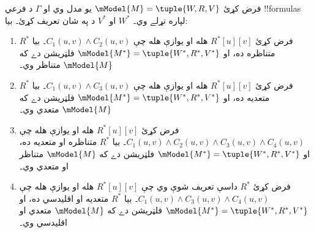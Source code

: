 \documentclass[../../../include/open-logic-section]{subfiles}
\begin{document}
\begin{thm}
  فرض کړئ $\mModel{M} =\tuple{W,R,V}$ يو مدل وي او $\Gamma$ د
  فرعي !!{formula}s لپاره تړلے وي۔ $W^*$ او $V^*$ د
   په شان تعريف کړئ۔ بيا:
  \begin{enumerate}
  \item فرض کړئ $R^*[u][v]$ هله او يوازې هله چې $C_1(u, v) \land
    C_2(u,v)$۔ بيا $R^*$ متناظره ده، او $\mModel{M^*} =
    \tuple{W^*,R^*,V^*}$ فلټريشن دے که $\mModel{M}$ متناظر وي۔
  \item فرض کړئ $R^*[u][v]$ هله او يوازې هله چې $C_1(u, v)
    \land C_3(u,v)$۔ بيا $R^*$ متعديه ده، او
    $\mModel{M^*}=\tuple{W^*,R^*,V^*}$ فلټريشن دے که
    $\mModel{M}$ متعدي وي۔
  \item فرض کړئ $R^*[u][v]$ هله او يوازې هله چې $C_1(u, v) \land C_2(u,v)
    \land C_3(u,v) \land C_4(u,v)$۔ بيا $R^*$ متناظره او متعديه
    ده، او $\mModel{M^*}=\tuple{W^*,R^*,V^*}$ فلټريشن دے که
    $\mModel{M}$ متناظر او متعدي وي۔
  \item فرض کړئ $R^*$ داسې تعريف شوې وي چې $R^*[u][v]$ هله او
    يوازې هله چې $C_1(u,
    v) \land C_3(u,v) \land C_4(u,v)$۔ بيا $R^*$ متعديه او
    اقليدسي ده، او $\mModel{M^*}=\tuple{W^*,R^*,V^*}$ فلټريشن
    دے که $\mModel{M}$ متعدي او اقليدسي وي۔
  \end{enumerate}
\end{thm}
\end{document}
